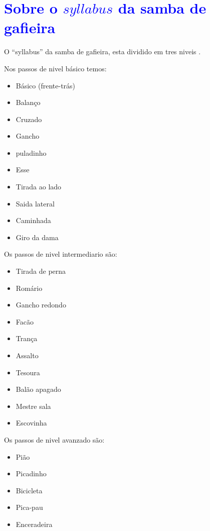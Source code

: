 
\chapter{\textcolor{blue}{Sobre o $syllabus$ da samba de gafieira}}

O ``syllabus'' da samba de gafieira, esta dividido em tres niveis \cite[pp. 144]{perna2002samba}.

Nos passos de nivel básico temos:
\begin{itemize}
\item Básico (frente-trás)
\item Balanço 
\item Cruzado
\item Gancho
\item puladinho
\item Esse
\item Tirada ao lado
\item Saida lateral
\item Caminhada
\item Giro da dama
\end{itemize}


Os passos de nivel intermediario são:
\begin{itemize}
\item Tirada de perna
\item Romário
\item Gancho redondo
\item Facão
\item Trança
\item Assalto
\item Tesoura
\item Balão apagado
\item Mestre sala
\item Escovinha
\end{itemize}

Os passos de nivel avanzado são:
\begin{itemize}
\item Pião
\item Picadinho
\item Bicicleta
\item Pica-pau
\item Enceradeira
\end{itemize}
